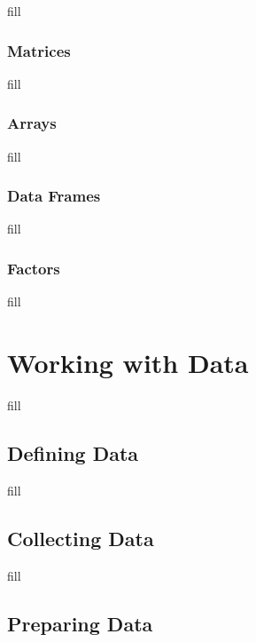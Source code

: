 \documentclass[
  b5paper]{book}
\begin{document}
fill

\hypertarget{matrices}{%
\subsection*{Matrices}\label{matrices}}

fill

\hypertarget{arrays}{%
\subsection*{Arrays}\label{arrays}}

fill

\hypertarget{data-frames}{%
\subsection*{Data Frames}\label{data-frames}}

fill

\hypertarget{factors}{%
\subsection*{Factors}\label{factors}}

fill

\hypertarget{working-with-data-1}{%
\chapter{Working with Data}\label{working-with-data-1}}

fill

\hypertarget{defining-data}{%
\section{Defining Data}\label{defining-data}}

fill

\hypertarget{collecting-data}{%
\section{Collecting Data}\label{collecting-data}}

fill

\hypertarget{preparing-data}{%
\section{Preparing Data}\label{preparing-data}}
\end{document}
